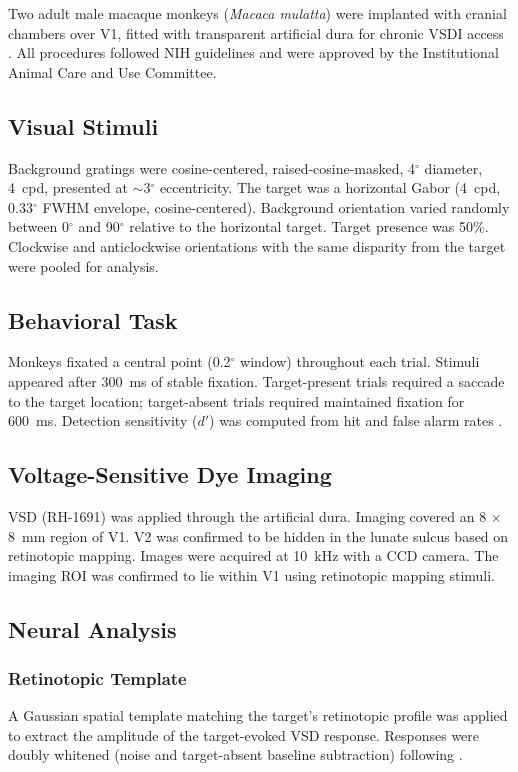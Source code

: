 \documentclass[11pt]{article}
\begin{document}
Two adult male macaque monkeys (\emph{Macaca mulatta}) were implanted with cranial chambers over V1, fitted with transparent artificial dura for chronic VSDI access \citep{seidemann2009}. All procedures followed NIH guidelines and were approved by the Institutional Animal Care and Use Committee.

\subsection{Visual Stimuli}

Background gratings were cosine-centered, raised-cosine-masked, 4$^\circ$ diameter, 4~cpd, presented at $\sim$3$^\circ$ eccentricity. The target was a horizontal Gabor (4~cpd, 0.33$^\circ$ FWHM envelope, cosine-centered). Background orientation varied randomly between 0$^\circ$ and 90$^\circ$ relative to the horizontal target. Target presence was 50\%. Clockwise and anticlockwise orientations with the same disparity from the target were pooled for analysis.

\subsection{Behavioral Task}

Monkeys fixated a central point (0.2$^\circ$ window) throughout each trial. Stimuli appeared after 300~ms of stable fixation. Target-present trials required a saccade to the target location; target-absent trials required maintained fixation for 600~ms. Detection sensitivity ($d'$) was computed from hit and false alarm rates \citep{green1966}.

\subsection{Voltage-Sensitive Dye Imaging}

VSD (RH-1691) was applied through the artificial dura. Imaging covered an 8 $\times$ 8~mm region of V1. V2 was confirmed to be hidden in the lunate sulcus based on retinotopic mapping. Images were acquired at 10~kHz with a CCD camera. The imaging ROI was confirmed to lie within V1 using retinotopic mapping stimuli.

\subsection{Neural Analysis}

\subsubsection{Retinotopic Template}
A Gaussian spatial template matching the target's retinotopic profile was applied to extract the amplitude of the target-evoked VSD response. Responses were doubly whitened (noise and target-absent baseline subtraction) following \citet{chen2012}.
\end{document}
